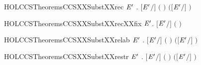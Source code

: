 \newcommand{\HOLCCSTheoremsCCSXXSubstXXprefix}{\UseVerbatim{HOLCCSTheoremsCCSXXSubstXXprefix}}
\begin{SaveVerbatim}{HOLCCSTheoremsCCSXXSubstXXrec}
\HOLTokenTurnstile{} \HOLSymConst{\HOLTokenForall{}}  \ensuremath{\HOLBoundVar{E}\sp{\prime{}}} .
     \ensuremath{[}\ensuremath{\HOLBoundVar{E}\sp{\prime{}}}\ensuremath{/}\ensuremath{]} \ensuremath{(}  \ensuremath{)} \HOLSymConst{\ensuremath{=}}
       \HOLSymConst{\ensuremath{=}}         \ensuremath{(}\ensuremath{[}\ensuremath{\HOLBoundVar{E}\sp{\prime{}}}\ensuremath{/}\ensuremath{]} \ensuremath{)}
\end{SaveVerbatim}
\newcommand{\HOLCCSTheoremsCCSXXSubstXXrec}{\UseVerbatim{HOLCCSTheoremsCCSXXSubstXXrec}}
\begin{SaveVerbatim}{HOLCCSTheoremsCCSXXSubstXXrecXXfix}
\HOLTokenTurnstile{} \HOLSymConst{\HOLTokenForall{}}  \ensuremath{\HOLBoundVar{E}\sp{\prime{}}}. \ensuremath{[}\ensuremath{\HOLBoundVar{E}\sp{\prime{}}}\ensuremath{/}\ensuremath{]} \ensuremath{(}  \ensuremath{)} \HOLSymConst{\ensuremath{=}}   
\end{SaveVerbatim}
\newcommand{\HOLCCSTheoremsCCSXXSubstXXrecXXfix}{\UseVerbatim{HOLCCSTheoremsCCSXXSubstXXrecXXfix}}
\begin{SaveVerbatim}{HOLCCSTheoremsCCSXXSubstXXrelab}
\HOLTokenTurnstile{} \HOLSymConst{\HOLTokenForall{}}  \ensuremath{\HOLBoundVar{E}\sp{\prime{}}} . \ensuremath{[}\ensuremath{\HOLBoundVar{E}\sp{\prime{}}}\ensuremath{/}\ensuremath{]} \ensuremath{(}  \ensuremath{)} \HOLSymConst{\ensuremath{=}}  \ensuremath{(}\ensuremath{[}\ensuremath{\HOLBoundVar{E}\sp{\prime{}}}\ensuremath{/}\ensuremath{]} \ensuremath{)} 
\end{SaveVerbatim}
\newcommand{\HOLCCSTheoremsCCSXXSubstXXrelab}{\UseVerbatim{HOLCCSTheoremsCCSXXSubstXXrelab}}
\begin{SaveVerbatim}{HOLCCSTheoremsCCSXXSubstXXrestr}
\HOLTokenTurnstile{} \HOLSymConst{\HOLTokenForall{}}  \ensuremath{\HOLBoundVar{E}\sp{\prime{}}} . \ensuremath{[}\ensuremath{\HOLBoundVar{E}\sp{\prime{}}}\ensuremath{/}\ensuremath{]} \ensuremath{(}  \ensuremath{)} \HOLSymConst{\ensuremath{=}}   \ensuremath{(}\ensuremath{[}\ensuremath{\HOLBoundVar{E}\sp{\prime{}}}\ensuremath{/}\ensuremath{]} \ensuremath{)}
\end{SaveVerbatim}
